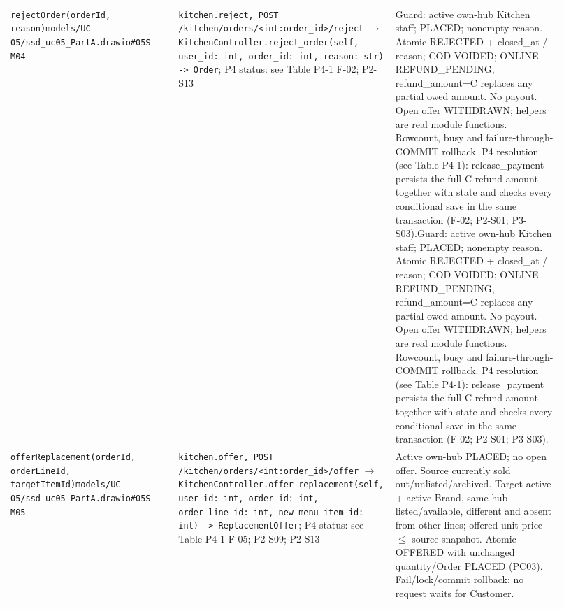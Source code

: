 \begin{longtable}{>{\raggedright\arraybackslash}p{0.3067\linewidth}>{\raggedright\arraybackslash}p{0.3067\linewidth}>{\raggedright\arraybackslash}p{0.3067\linewidth}}
\texttt{rejectOrder(orderId, reason)}\newline{}\texttt{models/\allowbreak{}UC-05/\allowbreak{}ssd\_\allowbreak{}uc05\_\allowbreak{}PartA.\allowbreak{}drawio\#05S-M04} & \texttt{kitchen.\allowbreak{}reject, POST /\allowbreak{}kitchen/\allowbreak{}orders/\allowbreak{}\textless{}int:order\_\allowbreak{}id\textgreater{}/\allowbreak{}reject} \ensuremath{\rightarrow} \texttt{KitchenController.\allowbreak{}reject\_\allowbreak{}order(self, user\_\allowbreak{}id: int, order\_\allowbreak{}id: int, reason: str) -\textgreater{} Order}; P4 status: see Table P4-1 F-02; P2-S13 & Guard: active own-hub Kitchen staff; PLACED; nonempty reason. Atomic REJECTED + closed\_at / reason; COD VOIDED; ONLINE REFUND\_PENDING, refund\_amount=C replaces any partial owed amount. No payout. Open offer WITHDRAWN; helpers are real module functions. Rowcount, busy and failure-through-COMMIT rollback. P4 resolution (see Table P4-1): release\_payment persists the full-C refund amount together with state and checks every conditional save in the same transaction (F-02; P2-S01; P3-S03).\newline{}Guard: active own-hub Kitchen staff; PLACED; nonempty reason. Atomic REJECTED + closed\_at / reason; COD VOIDED; ONLINE REFUND\_PENDING, refund\_amount=C replaces any partial owed amount. No payout. Open offer WITHDRAWN; helpers are real module functions. Rowcount, busy and failure-through-COMMIT rollback. P4 resolution (see Table P4-1): release\_payment persists the full-C refund amount together with state and checks every conditional save in the same transaction (F-02; P2-S01; P3-S03). \\
\texttt{offerReplacement(orderId, orderLineId, targetItemId)}\newline{}\texttt{models/\allowbreak{}UC-05/\allowbreak{}ssd\_\allowbreak{}uc05\_\allowbreak{}PartA.\allowbreak{}drawio\#05S-M05} & \texttt{kitchen.\allowbreak{}offer, POST /\allowbreak{}kitchen/\allowbreak{}orders/\allowbreak{}\textless{}int:order\_\allowbreak{}id\textgreater{}/\allowbreak{}offer} \ensuremath{\rightarrow} \texttt{KitchenController.\allowbreak{}offer\_\allowbreak{}replacement(self, user\_\allowbreak{}id: int, order\_\allowbreak{}id: int, order\_\allowbreak{}line\_\allowbreak{}id: int, new\_\allowbreak{}menu\_\allowbreak{}item\_\allowbreak{}id: int) -\textgreater{} ReplacementOffer}; P4 status: see Table P4-1 F-05; P2-S09; P2-S13 & Active own-hub PLACED; no open offer. Source currently sold out/unlisted/archived. Target active + active Brand, same-hub listed/available, different and absent from other lines; offered unit price \ensuremath{\leq} source snapshot. Atomic OFFERED with unchanged quantity/Order PLACED (PC03). Fail/lock/commit rollback; no request waits for Customer. \\

\end{longtable}
